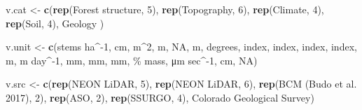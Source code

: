 \documentclass[
  12pt,
]{article}
\newenvironment{Shaded}{\begin{snugshade}}{\end{snugshade}}
\newcommand{\DecValTok}[1]{\textcolor[rgb]{0.00,0.00,0.81}{#1}}
\newcommand{\FunctionTok}[1]{\textcolor[rgb]{0.13,0.29,0.53}{\textbf{#1}}}
\newcommand{\NormalTok}[1]{#1}
\newcommand{\OtherTok}[1]{\textcolor[rgb]{0.56,0.35,0.01}{#1}}
\newcommand{\StringTok}[1]{\textcolor[rgb]{0.31,0.60,0.02}{#1}}
\begin{document}
\begin{Shaded}
\begin{Highlighting}[]
\NormalTok{v.cat }\OtherTok{\textless{}{-}} \FunctionTok{c}\NormalTok{(}\FunctionTok{rep}\NormalTok{(}\StringTok{\textquotesingle{}Forest structure\textquotesingle{}}\NormalTok{, }\DecValTok{5}\NormalTok{),}
             \FunctionTok{rep}\NormalTok{(}\StringTok{\textquotesingle{}Topography\textquotesingle{}}\NormalTok{, }\DecValTok{6}\NormalTok{),}
             \FunctionTok{rep}\NormalTok{(}\StringTok{\textquotesingle{}Climate\textquotesingle{}}\NormalTok{, }\DecValTok{4}\NormalTok{),}
             \FunctionTok{rep}\NormalTok{(}\StringTok{\textquotesingle{}Soil\textquotesingle{}}\NormalTok{, }\DecValTok{4}\NormalTok{),}
             \StringTok{\textquotesingle{}Geology\textquotesingle{}}
\NormalTok{             )}

\NormalTok{v.unit }\OtherTok{\textless{}{-}} \FunctionTok{c}\NormalTok{(}\StringTok{\textquotesingle{}stems ha\^{}{-}1\textquotesingle{}}\NormalTok{, }\StringTok{\textquotesingle{}cm\textquotesingle{}}\NormalTok{, }\StringTok{\textquotesingle{}m\^{}2\textquotesingle{}}\NormalTok{, }\StringTok{\textquotesingle{}m\textquotesingle{}}\NormalTok{, }\StringTok{\textquotesingle{}NA\textquotesingle{}}\NormalTok{,}
            \StringTok{\textquotesingle{}m\textquotesingle{}}\NormalTok{, }\StringTok{\textquotesingle{}degrees\textquotesingle{}}\NormalTok{, }\StringTok{\textquotesingle{}index\textquotesingle{}}\NormalTok{, }\StringTok{\textquotesingle{}index\textquotesingle{}}\NormalTok{, }\StringTok{\textquotesingle{}index\textquotesingle{}}\NormalTok{, }\StringTok{\textquotesingle{}index\textquotesingle{}}\NormalTok{,}
            \StringTok{\textquotesingle{}m\textquotesingle{}}\NormalTok{, }\StringTok{\textquotesingle{}m day\^{}{-}1\textquotesingle{}}\NormalTok{, }\StringTok{\textquotesingle{}mm\textquotesingle{}}\NormalTok{, }\StringTok{\textquotesingle{}mm\textquotesingle{}}\NormalTok{,}
            \StringTok{\textquotesingle{}mm\textquotesingle{}}\NormalTok{, }\StringTok{\textquotesingle{}\% mass\textquotesingle{}}\NormalTok{, }\StringTok{\textquotesingle{}μm sec\^{}{-}1\textquotesingle{}}\NormalTok{, }\StringTok{\textquotesingle{}cm\textquotesingle{}}\NormalTok{, }
            \StringTok{\textquotesingle{}NA\textquotesingle{}}\NormalTok{)}

\NormalTok{v.src }\OtherTok{\textless{}{-}} \FunctionTok{c}\NormalTok{(}\FunctionTok{rep}\NormalTok{(}\StringTok{\textquotesingle{}NEON LiDAR\textquotesingle{}}\NormalTok{, }\DecValTok{5}\NormalTok{),}
           \FunctionTok{rep}\NormalTok{(}\StringTok{\textquotesingle{}NEON LiDAR\textquotesingle{}}\NormalTok{, }\DecValTok{6}\NormalTok{),}
           \FunctionTok{rep}\NormalTok{(}\StringTok{\textquotesingle{}BCM (Budo et al. 2017)\textquotesingle{}}\NormalTok{, }\DecValTok{2}\NormalTok{), }\FunctionTok{rep}\NormalTok{(}\StringTok{\textquotesingle{}ASO\textquotesingle{}}\NormalTok{, }\DecValTok{2}\NormalTok{),}
           \FunctionTok{rep}\NormalTok{(}\StringTok{\textquotesingle{}SSURGO\textquotesingle{}}\NormalTok{, }\DecValTok{4}\NormalTok{),}
           \StringTok{\textquotesingle{}Colorado Geological Survey\textquotesingle{}}\NormalTok{)}


\end{Highlighting}
\end{Shaded}
\end{document}
